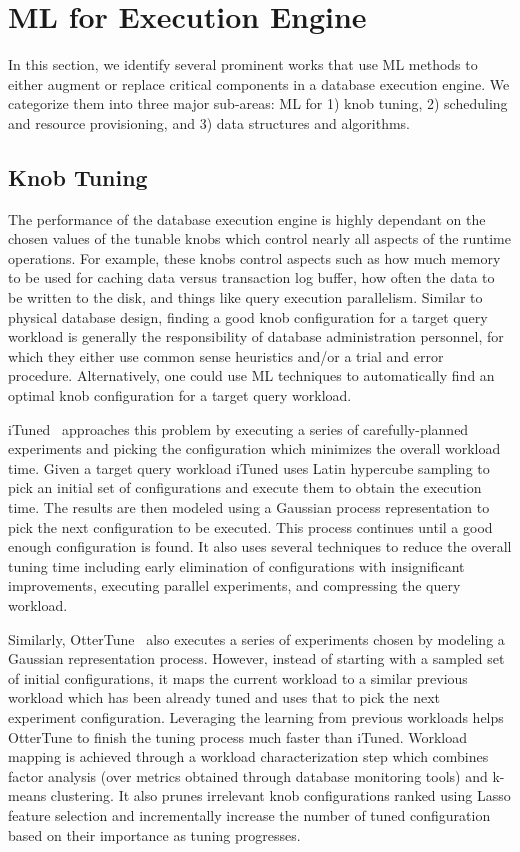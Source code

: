 \section{ML for Execution Engine}
In this section, we identify several prominent works that use ML methods to either augment or replace critical components in a database execution engine.
We categorize them into three major sub-areas: ML for 1) knob tuning, 2) scheduling and resource provisioning, and 3) data structures and algorithms.

\subsection{Knob Tuning}
The performance of the database execution engine is highly dependant on the chosen values of the tunable knobs which control nearly all aspects of the runtime operations.
For example, these knobs control aspects such as how much memory to be used for caching data versus transaction log buffer, how often the data to be written to the disk, and things like query execution parallelism.
Similar to physical database design, finding a good knob configuration for a target query workload is generally the responsibility of database administration personnel, for which they either use common sense heuristics and/or a trial and error procedure.
Alternatively, one could use ML techniques to automatically find an optimal knob configuration for a target query workload.

iTuned~\cite{ituned} approaches this problem by executing a series of carefully-planned experiments and picking the configuration which minimizes the overall workload time.
Given a target query workload iTuned uses Latin hypercube sampling to pick an initial set of configurations and execute them to obtain the execution time.
The results are then modeled using a Gaussian process representation to pick the next configuration to be executed.
This process continues until a good enough configuration is found.
It also uses several techniques to reduce the overall tuning time including early elimination of configurations with insignificant improvements, executing parallel experiments, and compressing the query workload.

Similarly, OtterTune~\cite{ottertune} also executes a series of experiments chosen by modeling a Gaussian representation process.
However, instead of starting with a sampled set of initial configurations, it maps the current workload to a similar previous workload which has been already tuned and uses that to pick the next experiment configuration.
Leveraging the learning from previous workloads helps OtterTune to finish the tuning process much faster than iTuned.
Workload mapping is achieved through a workload characterization step which combines factor analysis (over metrics obtained through database monitoring tools) and k-means clustering.
It also prunes irrelevant knob configurations ranked using Lasso feature selection and incrementally increase the number of tuned configuration based on their importance as tuning progresses.

